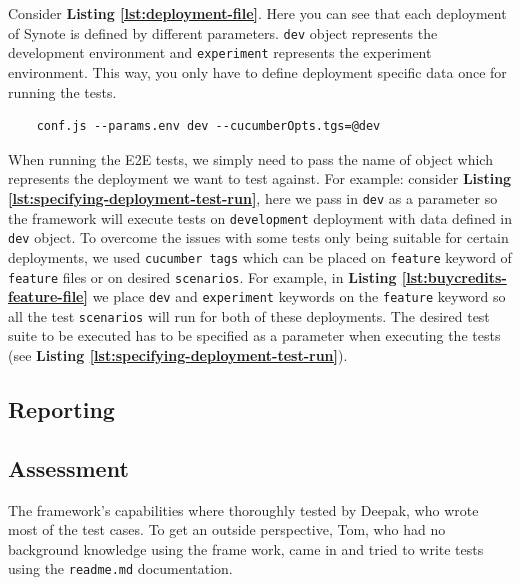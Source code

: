 Consider \textbf{Listing \ref{lst:deployment-file}}. Here you can see that each deployment of Synote is defined by different parameters. \texttt{dev} object represents the development environment and \texttt{experiment} represents the experiment environment. This way, you only have to define deployment specific data once for running the tests. 

\begin{listing}[H]
\begin{verbatim}
	conf.js --params.env dev --cucumberOpts.tgs=@dev
\end{verbatim}
\label{lst:specifying-deployment-test-run}
\end{listing}

When running the E2E tests, we simply need to pass the name of object which represents the deployment we want to test against. For example: consider \textbf{Listing \ref{lst:specifying-deployment-test-run}}, here we pass in \texttt{dev} as a parameter so the framework will execute tests on \texttt{development} deployment with data defined in \texttt{dev} object.  To overcome the issues with some tests only being suitable for certain deployments, we used \texttt{cucumber tags} which can be placed on \texttt{feature} keyword of \texttt{feature} files or on desired \texttt{scenarios}. For example, in \textbf{Listing \ref{lst:buycredits-feature-file}} we place \texttt{dev} and \texttt{experiment} keywords on the \texttt{feature} keyword so all the test \texttt{scenarios} will run for both of these deployments. The desired test suite to be executed has to be specified as a parameter when executing the tests (see \textbf{Listing \ref{lst:specifying-deployment-test-run}}).
 
\subsection{Reporting}
\label{subsec:reporting}

\subsection{Assessment}
\label{subsec:assessment}
The framework's capabilities where thoroughly tested by Deepak, who wrote most of the test cases. To get an outside perspective, Tom, who had no background knowledge using the frame work, came in and tried to write tests using the \texttt{readme.md} documentation.

